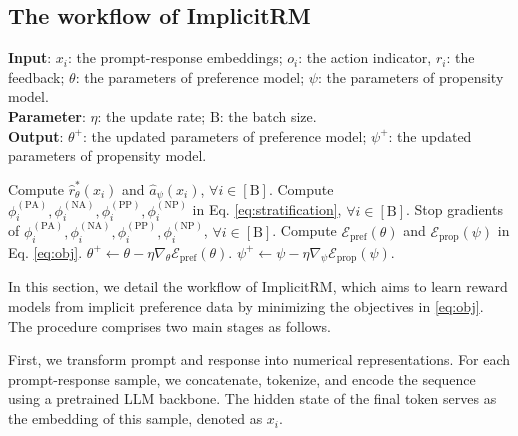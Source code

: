 \documentclass[]{arxiv_singlecolumn}
\theoremstyle{plain}
\theoremstyle{definition}
\theoremstyle{remark}
\begin{document}
\subsection{The workflow of ImplicitRM}
\label{subsec:workflow}
\begin{algorithm}[t]
\caption{The workflow of ImplicitRM.}
\label{alg:ImplicitRM}
\small
\textbf{Input}: $x_i$: the prompt-response embeddings; $o_{i}$: the action indicator, $r_i$: the feedback; $\theta$: the parameters of preference model; $\psi$: the parameters of propensity model. \\
\textbf{Parameter}: 
$\eta$: the update rate; $\mathrm{B}$: the batch size. \\
\textbf{Output}: $\theta^+$: the updated parameters of preference model; $\psi^+$: the updated parameters of propensity model. \\
\begin{algorithmic}[1] %
\setlength{\baselineskip}{1.6em}
\STATE Compute $\hat{r}^*_\theta (x_i)$ and $\hat{a}_\psi (x_i)$, $\forall i \in [\mathrm{B}]$.
\STATE Compute $\phi^\mathrm{(PA)}_i, \phi^\mathrm{(NA)}_i, \phi^\mathrm{(PP)}_i, \phi^\mathrm{(NP)}_i$ in Eq. \eqref{eq:stratification}, $\forall i \in [\mathrm{B}]$.
\STATE Stop gradients of $\phi^\mathrm{(PA)}_i, \phi^\mathrm{(NA)}_i, \phi^\mathrm{(PP)}_i, \phi^\mathrm{(NP)}_i$, $\forall i \in [\mathrm{B}]$.
\STATE Compute $\mathcal{E}_\mathrm{pref}(\theta)$ and $\mathcal{E}_\mathrm{prop}(\psi)$ in Eq. \eqref{eq:obj}.
\STATE $\theta^+\leftarrow\theta-\eta\nabla_\theta \mathcal{E}_\mathrm{pref}(\theta)$.
\STATE $\psi^+\leftarrow\psi-\eta\nabla_\psi \mathcal{E}_\mathrm{prop}(\psi)$.
\end{algorithmic}
\end{algorithm}



In this section, we detail the workflow of ImplicitRM, which aims to learn reward models from implicit preference data by minimizing the objectives in \eqref{eq:obj}. The procedure comprises two main stages as follows.

First, we transform prompt and response into numerical representations. For each prompt-response sample, we concatenate, tokenize, and encode the sequence using a pretrained LLM backbone. The hidden state of the final token serves as the embedding of this sample, denoted as $x_i$. 
\end{document}
